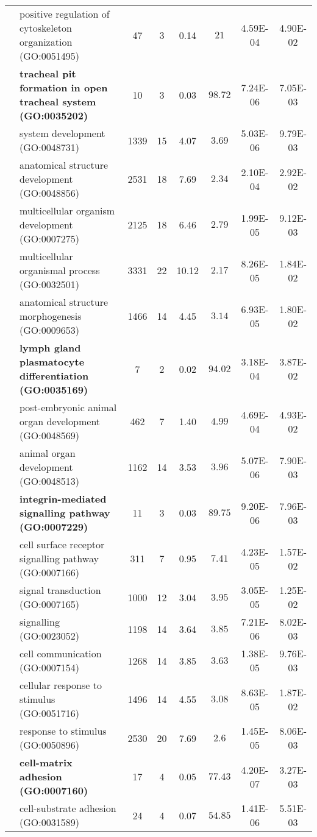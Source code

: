 \begin{table}[!b]
\begin{center}
\begin{tabular}{clS[table-format=4.0]S[table-format=2.0]S[table-format=2.2]ccc}
 & positive regulation of cytoskeleton organization (GO:0051495) & 47 & 3 & 0.14 & $21$ & 4.59E-04 & 4.90E-02 \\[1.5ex]
 & \textbf{tracheal pit formation in open tracheal system (GO:0035202)} & 10 & 3 & 0.03 & $98.72$ & 7.24E-06 & 7.05E-03 \\
 & system development (GO:0048731) & 1339 & 15 & 4.07 & $3.69$ & 5.03E-06 & 9.79E-03 \\
 & anatomical structure development (GO:0048856) & 2531 & 18 & 7.69 & $2.34$ & 2.10E-04 & 2.92E-02 \\
 & multicellular organism development (GO:0007275) & 2125 & 18 & 6.46 & $2.79$ & 1.99E-05 & 9.12E-03 \\
 & multicellular organismal process (GO:0032501) & 3331 & 22 & 10.12 & $2.17$ & 8.26E-05 & 1.84E-02 \\
 & anatomical structure morphogenesis (GO:0009653) & 1466 & 14 & 4.45 & $3.14$ & 6.93E-05 & 1.80E-02 \\[1.5ex]
 & \textbf{lymph gland plasmatocyte differentiation (GO:0035169)} & 7 & 2 & 0.02 & $94.02$ & 3.18E-04 & 3.87E-02 \\
 & post-embryonic animal organ development (GO:0048569) & 462 & 7 & 1.40 & $4.99$ & 4.69E-04 & 4.93E-02 \\
 & animal organ development (GO:0048513) & 1162 & 14 & 3.53 & $3.96$ & 5.07E-06 & 7.90E-03 \\[1.5ex]
 & \textbf{integrin-mediated signalling pathway (GO:0007229)} & 11 & 3 & 0.03 & $89.75$ & 9.20E-06 & 7.96E-03 \\
 & cell surface receptor signalling pathway (GO:0007166) & 311 & 7 & 0.95 & $7.41$ & 4.23E-05 & 1.57E-02 \\
 & signal transduction (GO:0007165) & 1000 & 12 & 3.04 & $3.95$ & 3.05E-05 & 1.25E-02 \\
 & signalling (GO:0023052) & 1198 & 14 & 3.64 & $3.85$ & 7.21E-06 & 8.02E-03 \\
 & cell communication (GO:0007154) & 1268 & 14 & 3.85 & $3.63$ & 1.38E-05 & 9.76E-03 \\
 & cellular response to stimulus (GO:0051716) & 1496 & 14 & 4.55 & $3.08$ & 8.63E-05 & 1.87E-02 \\
 & response to stimulus (GO:0050896) & 2530 & 20 & 7.69 & $2.6$ & 1.45E-05 & 8.06E-03 \\[1.5ex]
 & \textbf{cell-matrix adhesion (GO:0007160)} & 17 & 4 & 0.05 & $77.43$ & 4.20E-07 & 3.27E-03 \\
 & cell-substrate adhesion (GO:0031589) & 24 & 4 & 0.07 & $54.85$ & 1.41E-06 & 5.51E-03 \\

\end{tabular}
\end{center}
\end{table}
